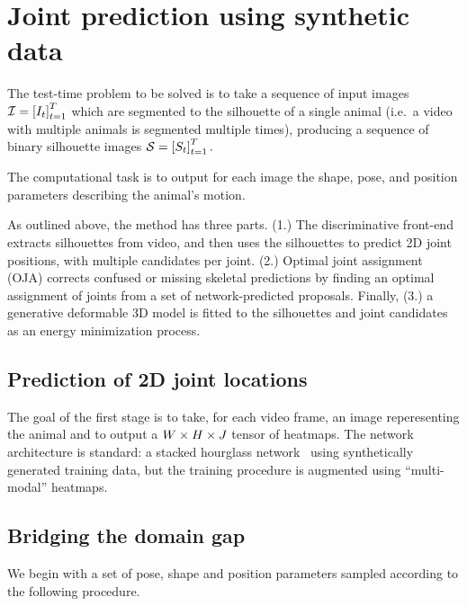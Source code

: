 \section{Joint prediction using synthetic data}


The test-time problem to be solved is to take a sequence of input images
$
\mathcal I = \left[{I_{t}}\right]_{t=1}^{T}
$
which are segmented to the silhouette of a single animal (i.e.~a video with multiple animals is segmented multiple times), producing a sequence of binary silhouette images 
$
\mathcal S = \left[{S_{t}}\right]_{t=1}^{T}.
$

The computational task is to output for each image the shape, pose, and position parameters describing the animal's motion.

As outlined above, the method has three parts.  
(1.) The discriminative front-end extracts silhouettes from video, and then uses the silhouettes to predict 2D joint positions, with multiple candidates per joint. 
(2.) Optimal joint assignment (OJA) corrects confused or missing skeletal predictions by finding an optimal assignment of joints from a set of network-predicted proposals. Finally, (3.) a generative deformable 3D model is fitted to the silhouettes and joint candidates as an energy minimization process.

\subsection{Prediction of 2D joint locations}

The goal of the first stage is to take, for each video frame, an image reperesenting the animal and to output a $W \times H \times J$ tensor of heatmaps. The network architecture is standard: a stacked hourglass network~\cite{newell2016stacked} using synthetically generated training data, but the training procedure is augmented using ``multi-modal'' heatmaps.


\subsection{Bridging the domain gap}

We begin with a set of pose, shape and position parameters sampled according to the following procedure. 

